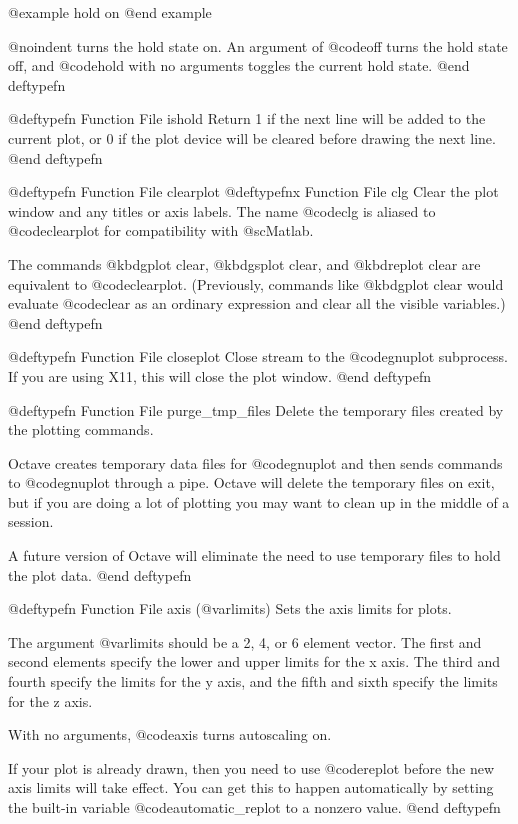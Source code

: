 @example
hold on
@end example

@noindent
turns the hold state on.  An argument of @code{off} turns the hold state
off, and @code{hold} with no arguments toggles the current hold state.
@end deftypefn

@deftypefn {Function File} {} ishold
Return 1 if the next line will be added to the current plot, or 0 if
the plot device will be cleared before drawing the next line.
@end deftypefn

@deftypefn {Function File} {} clearplot
@deftypefnx {Function File} {} clg
Clear the plot window and any titles or axis labels.  The name
@code{clg} is aliased to @code{clearplot} for compatibility with @sc{Matlab}.

The commands @kbd{gplot clear}, @kbd{gsplot clear}, and @kbd{replot
clear} are equivalent to @code{clearplot}.  (Previously, commands like
@kbd{gplot clear} would evaluate @code{clear} as an ordinary expression
and clear all the visible variables.)
@end deftypefn

@deftypefn {Function File} {} closeplot
Close stream to the @code{gnuplot} subprocess.  If you are using X11,
this will close the plot window.
@end deftypefn

@deftypefn {Function File} {} purge_tmp_files
Delete the temporary files created by the plotting commands.

Octave creates temporary data files for @code{gnuplot} and then sends
commands to @code{gnuplot} through a pipe.  Octave will delete the
temporary files on exit, but if you are doing a lot of plotting you may
want to clean up in the middle of a session.

A future version of Octave will eliminate the need to use temporary
files to hold the plot data.
@end deftypefn

@deftypefn {Function File} {} axis (@var{limits})
Sets the axis limits for plots.

The argument @var{limits} should be a 2, 4, or 6 element vector.  The
first and second elements specify the lower and upper limits for the x
axis.  The third and fourth specify the limits for the y axis, and the
fifth and sixth specify the limits for the z axis.

With no arguments, @code{axis} turns autoscaling on.

If your plot is already drawn, then you need to use @code{replot} before
the new axis limits will take effect.  You can get this to happen
automatically by setting the built-in variable @code{automatic_replot}
to a nonzero value.
@end deftypefn

